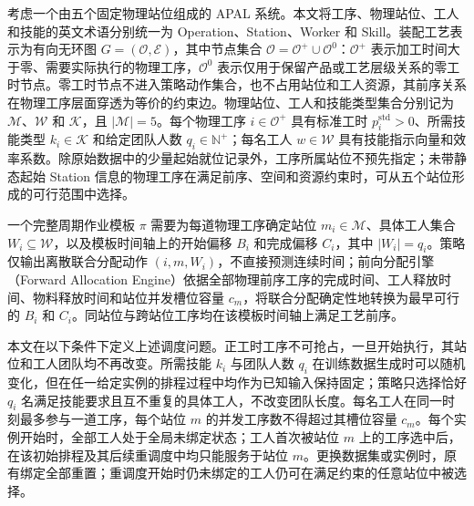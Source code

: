 \documentclass[journal,10pt]{IEEEtran}
\begin{document}
考虑一个由五个固定物理站位组成的 APAL 系统。本文将工序、物理站位、工人和技能的英文术语分别统一为 Operation、Station、Worker 和 Skill。装配工艺表示为有向无环图 \(G=(\mathcal{O},\mathcal{E})\)，其中节点集合 \(\mathcal{O}=\mathcal{O}^{+}\cup\mathcal{O}^{0}\)：\(\mathcal{O}^{+}\) 表示加工时间大于零、需要实际执行的物理工序，\(\mathcal{O}^{0}\) 表示仅用于保留产品或工艺层级关系的零工时节点。零工时节点不进入策略动作集合，也不占用站位和工人资源，其前序关系在物理工序层面穿透为等价的约束边。物理站位、工人和技能类型集合分别记为 \(\mathcal{M}\)、\(\mathcal{W}\) 和 \(\mathcal{K}\)，且 \(|\mathcal{M}|=5\)。每个物理工序 \(i\in\mathcal{O}^{+}\) 具有标准工时 \(p_i^{\mathrm{std}}>0\)、所需技能类型 \(k_i\in\mathcal{K}\) 和给定团队人数 \(q_i\in\mathbb{N}^{+}\)；每名工人 \(w\in\mathcal{W}\) 具有技能指示向量和效率系数。除原始数据中的少量起始就位记录外，工序所属站位不预先指定；未带静态起始 Station 信息的物理工序在满足前序、空间和资源约束时，可从五个站位形成的可行范围中选择。

一个完整周期作业模板 \(\pi\) 需要为每道物理工序确定站位 \(m_i\in\mathcal{M}\)、具体工人集合 \(W_i\subseteq\mathcal{W}\)，以及模板时间轴上的开始偏移 \(B_i\) 和完成偏移 \(C_i\)，其中 \(|W_i|=q_i\)。策略仅输出离散联合分配动作 \((i,m,W_i)\)，不直接预测连续时间；前向分配引擎（Forward Allocation Engine）依据全部物理前序工序的完成时间、工人释放时间、物料释放时间和站位并发槽位容量 \(c_m\)，将联合分配确定性地转换为最早可行的 \(B_i\) 和 \(C_i\)。同站位与跨站位工序均在该模板时间轴上满足工艺前序。

本文在以下条件下定义上述调度问题。正工时工序不可抢占，一旦开始执行，其站位和工人团队均不再改变。所需技能 \(k_i\) 与团队人数 \(q_i\) 在训练数据生成时可以随机变化，但在任一给定实例的排程过程中均作为已知输入保持固定；策略只选择恰好 \(q_i\) 名满足技能要求且互不重复的具体工人，不改变团队长度。每名工人在同一时刻最多参与一道工序，每个站位 \(m\) 的并发工序数不得超过其槽位容量 \(c_m\)。每个实例开始时，全部工人处于全局未绑定状态；工人首次被站位 \(m\) 上的工序选中后，在该初始排程及其后续重调度中均只能服务于站位 \(m\)。更换数据集或实例时，原有绑定全部重置；重调度开始时仍未绑定的工人仍可在满足约束的任意站位中被选择。
\end{document}
